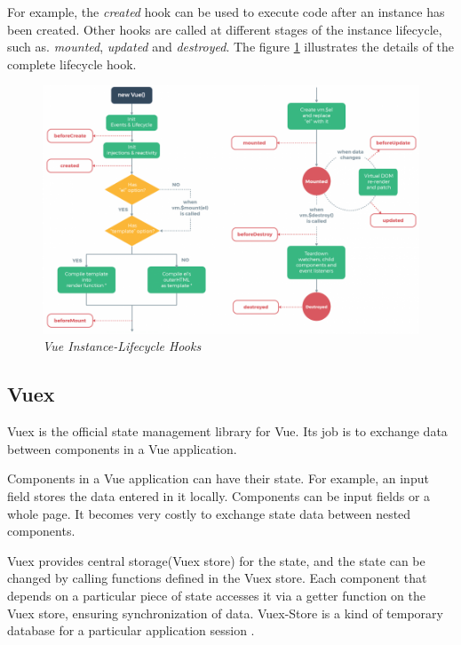For example, the \textit{created} hook can be used to execute code after an instance has been created. Other hooks are called at different stages of the instance lifecycle, such as. \textit{mounted}, \textit{updated} and \textit{destroyed}. The figure \ref{fig:OrganisationOfComponents} illustrates the details of the complete lifecycle hook.

\begin{figure}[H]
  \centering
  \includegraphics[width=1\textwidth]{Bilder/img/lifecycle_.png}  
  \caption{ \textit{Vue Instance-Lifecycle Hooks} \cite{InstancVue:Online}}%
\label{fig:OrganisationOfComponents}
\end{figure}



\subsection{Vuex }
\label{sec:Vuex}
Vuex is the official state management library for Vue. Its job is to exchange data between components in a Vue application.

Components in a Vue application can have their state. For example, an input field stores the data entered in it locally. Components can be input fields or a whole page. It becomes very costly to exchange state data between nested components.

Vuex provides central storage(Vuex store) for the state, and the state can be changed by calling functions defined in the Vuex store.
Each component that depends on a particular piece of state accesses it via a getter function on the Vuex store, ensuring synchronization of data. Vuex-Store is a kind of temporary database for a particular application session \cite{VueGuide:Online}.


